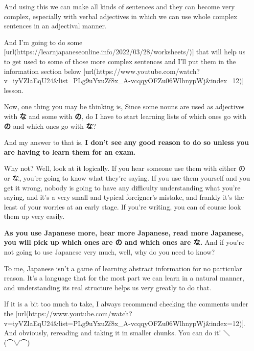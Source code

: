 And using this we can make all kinds of sentences and they can become very complex, especially with verbal adjectives in which we can use whole complex sentences in an adjectival manner.

And I'm going to do some [url(https://learnjapaneseonline.info/2022/03/28/worksheets/)] that will help us to get used to some of those more complex sentences and I'll put them in the information section below [url(https://www.youtube.com/watch?v=iyVZlaEqU24&list=PLg9uYxuZf8x_A-vcqqyOFZu06WlhnypWj&index=12)] lesson.

Now, one thing you may be thinking is, Since some nouns are used as adjectives with {\bf な} and some with {\bf の}, do I have to start learning lists of which ones go with {\bf の} and which ones go with {\bf な}?

{}

And my answer to that is, {\bf I don't see any good reason to do so unless you are having to learn them for an exam.}

Why not? Well, look at it logically. If you hear someone use them with either の or な, you're going to know what they're saying. If you use them yourself and you get it wrong, nobody is going to have any difficulty understanding what you're saying, and it's a very small and typical foreigner's mistake, and frankly it's the least of your worries at an early stage. If you're writing, you can of course look them up very easily.

\thinrule

{\bf As you use Japanese more, hear more Japanese, read more Japanese, you will pick up which ones are の and which ones are な.} And if you're not going to use Japanese very much, well, why do you need to know?

To me, Japanese isn't a game of learning abstract information for no particular reason. It's a language that for the most part we can learn in a natural manner, and understanding its real structure helps us very greatly to do that.

If it is a bit too much to take, I always recommend checking the comments under the [url(https://www.youtube.com/watch?v=iyVZlaEqU24&list=PLg9uYxuZf8x_A-vcqqyOFZu06WlhnypWj&index=12)]. And obviously, rereading and taking it in smaller chunks. You can do it! ＼(⌒▽⌒)

\stopsectionlevel

\stopsectionlevel
